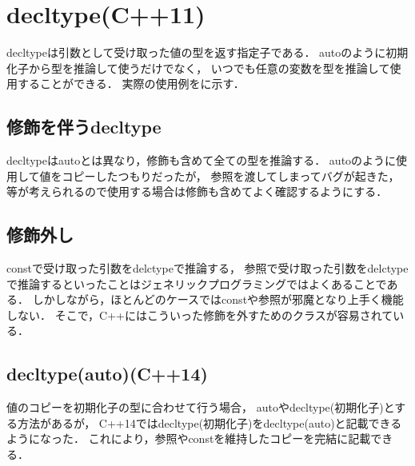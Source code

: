 \section{decltype(C++11)}
decltypeは引数として受け取った値の型を返す指定子である．
autoのように初期化子から型を推論して使うだけでなく，
いつでも任意の変数を型を推論して使用することができる．
実際の使用例をに示す．


\subsection{修飾を伴うdecltype}
decltypeはautoとは異なり，修飾も含めて全ての型を推論する．
autoのように使用して値をコピーしたつもりだったが，
参照を渡してしまってバグが起きた，
等が考えられるので使用する場合は修飾も含めてよく確認するようにする．

\subsection{修飾外し}
constで受け取った引数をdelctypeで推論する，
参照で受け取った引数をdelctypeで推論するといったことはジェネリックプログラミングではよくあることである．
しかしながら，ほとんどのケースではconstや参照が邪魔となり上手く機能しない．
そこで，C++にはこういった修飾を外すためのクラスが容易されている．

\subsection{decltype(auto)(C++14)}
値のコピーを初期化子の型に合わせて行う場合，
autoやdecltype(初期化子)とする方法があるが，
C++14ではdecltype(初期化子)をdecltype(auto)と記載できるようになった．
これにより，参照やconstを維持したコピーを完結に記載できる．

